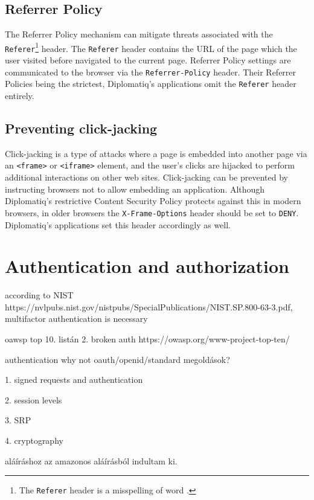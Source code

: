\subsection{Referrer Policy}

The Referrer Policy mechanism can mitigate threats associated with the \lstinline{Referer}\footnote{The \lstinline{Referer} header is a misspelling of word .} header. The \lstinline{Referer} header contains the URL of the page which the user visited before navigated to the current page. Referrer Policy settings are communicated to the browser via the \lstinline{Referrer-Policy} header. Their Referrer Policies being the strictest, Diplomatiq's applications omit the \lstinline{Referer} header entirely.

\subsection{Preventing click-jacking}

Click-jacking is a type of attacks where a page is embedded into another page via an \lstinline{<frame>} or \lstinline{<iframe>} element, and the user's clicks are hijacked to perform additional interactions on other web sites. Click-jacking can be prevented by instructing browsers not to allow embedding an application. Although Diplomatiq's restrictive Content Security Policy protects against this in modern browsers, in older browsers the \lstinline{X-Frame-Options} header should be set to \lstinline{DENY}. Diplomatiq's applications set this header accordingly as well.

\section{Authentication and authorization}

according to NIST https://nvlpubs.nist.gov/nistpubs/SpecialPublications/NIST.SP.800-63-3.pdf, multifactor authentication is necessary

oawsp top 10. listán 2. broken auth https://owasp.org/www-project-top-ten/

authentication why not oauth/openid/standard megoldások?

    1. signed requests and authentication

    2. session levels

    3. SRP

    4. cryptography

aláíráshoz az amazonos aláírásból indultam ki.

